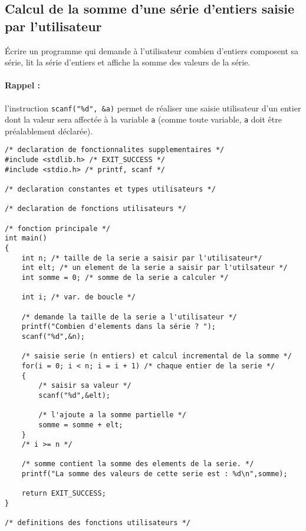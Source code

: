 \subsection{Calcul de la somme d'une série d'entiers saisie par l'utilisateur}

Écrire un programme qui demande à l'utilisateur combien d'entiers
composent sa série, lit la série d'entiers et affiche la somme des
valeurs de la série. 

\paragraph{Rappel :} l'instruction 
\verb+scanf("%d", &a)+
permet de réaliser une saisie utilisateur d'un entier dont la valeur
sera affectée à la variable \texttt{a} (comme toute variable, \texttt{a} doit
être préalablement déclarée).

\begin{correction}
\begin{verbatim}
/* declaration de fonctionnalites supplementaires */
#include <stdlib.h> /* EXIT_SUCCESS */
#include <stdio.h> /* printf, scanf */

/* declaration constantes et types utilisateurs */

/* declaration de fonctions utilisateurs */

/* fonction principale */
int main()
{
    int n; /* taille de la serie a saisir par l'utilisateur*/
    int elt; /* un element de la serie a saisir par l'utilsateur */
    int somme = 0; /* somme de la serie a calculer */

    int i; /* var. de boucle */

    /* demande la taille de la serie a l'utilisateur */
    printf("Combien d'elements dans la série ? ");
    scanf("%d",&n);

    /* saisie serie (n entiers) et calcul incremental de la somme */
    for(i = 0; i < n; i = i + 1) /* chaque entier de la serie */
    {
        /* saisir sa valeur */
        scanf("%d",&elt);

        /* l'ajoute a la somme partielle */
        somme = somme + elt;
    }
    /* i >= n */

    /* somme contient la somme des elements de la serie. */
    printf("La somme des valeurs de cette serie est : %d\n",somme);

    return EXIT_SUCCESS;
}

/* definitions des fonctions utilisateurs */
\end{verbatim}
\end{correction}


